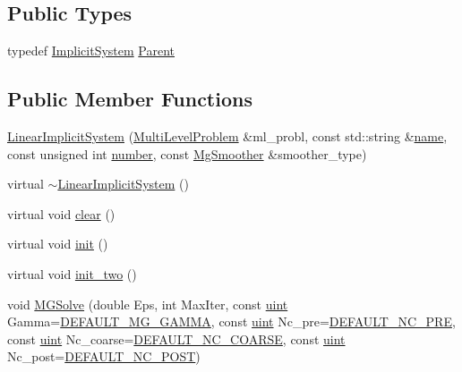 \subsection*{Public Types}
\begin{DoxyCompactItemize}
\item 
typedef \mbox{\hyperlink{classfemus_1_1_implicit_system}{Implicit\+System}} \mbox{\hyperlink{classfemus_1_1_linear_implicit_system_adfad06f69aa5ec8ddeefa0b430480a1d}{Parent}}
\end{DoxyCompactItemize}
\subsection*{Public Member Functions}
\begin{DoxyCompactItemize}
\item 
\mbox{\hyperlink{classfemus_1_1_linear_implicit_system_abb2b154f0d4810da64d7a4ac269b1ae4}{Linear\+Implicit\+System}} (\mbox{\hyperlink{classfemus_1_1_multi_level_problem}{Multi\+Level\+Problem}} \&ml\+\_\+probl, const std\+::string \&\mbox{\hyperlink{classfemus_1_1_system_a1a007c176529dae649887bbd1cb46103}{name}}, const unsigned int \mbox{\hyperlink{classfemus_1_1_system_a28f5c7f6286dd597ae28a8923c8dca11}{number}}, const \mbox{\hyperlink{_mg_smoother_enum_8hpp_a4d11c2ff93e2f0f440c879a9c40cda71}{Mg\+Smoother}} \&smoother\+\_\+type)
\item 
virtual \mbox{\hyperlink{classfemus_1_1_linear_implicit_system_a7e657ed9fea92f25fc204a1a7fb9bb4a}{$\sim$\+Linear\+Implicit\+System}} ()
\item 
virtual void \mbox{\hyperlink{classfemus_1_1_linear_implicit_system_ace039665432e53db0c25b0efede44a76}{clear}} ()
\item 
virtual void \mbox{\hyperlink{classfemus_1_1_linear_implicit_system_a4605bac9ea670bb7dbd4454358155670}{init}} ()
\item 
virtual void \mbox{\hyperlink{classfemus_1_1_linear_implicit_system_a821e5e01d07a2124ff6f0130f67b5ba6}{init\+\_\+two}} ()
\item 
void \mbox{\hyperlink{classfemus_1_1_linear_implicit_system_a213ed6f52d201362753935f67e0ba30f}{M\+G\+Solve}} (double Eps, int Max\+Iter, const \mbox{\hyperlink{_typedefs_8hpp_a91ad9478d81a7aaf2593e8d9c3d06a14}{uint}} Gamma=\mbox{\hyperlink{_femus_default_8hpp_aa6458acc1fd5bf491e4121ebb5c115e1}{D\+E\+F\+A\+U\+L\+T\+\_\+\+M\+G\+\_\+\+G\+A\+M\+MA}}, const \mbox{\hyperlink{_typedefs_8hpp_a91ad9478d81a7aaf2593e8d9c3d06a14}{uint}} Nc\+\_\+pre=\mbox{\hyperlink{_femus_default_8hpp_a56e01beffdefa0f94bdf92f9bfc990f6}{D\+E\+F\+A\+U\+L\+T\+\_\+\+N\+C\+\_\+\+P\+RE}}, const \mbox{\hyperlink{_typedefs_8hpp_a91ad9478d81a7aaf2593e8d9c3d06a14}{uint}} Nc\+\_\+coarse=\mbox{\hyperlink{_femus_default_8hpp_a95a240c38b468754cc507c3597c90807}{D\+E\+F\+A\+U\+L\+T\+\_\+\+N\+C\+\_\+\+C\+O\+A\+R\+SE}}, const \mbox{\hyperlink{_typedefs_8hpp_a91ad9478d81a7aaf2593e8d9c3d06a14}{uint}} Nc\+\_\+post=\mbox{\hyperlink{_femus_default_8hpp_a0f88c327f74f1f82803c5a506d426b92}{D\+E\+F\+A\+U\+L\+T\+\_\+\+N\+C\+\_\+\+P\+O\+ST}})

\end{DoxyCompactItemize}
